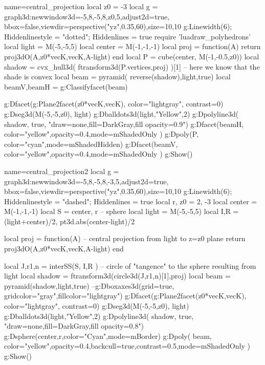 \documentclass[border=5pt]{standalone}%
\begin{document}
%
\begin{luadraw}{name=central_projection}
local z0 = -3
local g = graph3d:new{window3d={-5,8,-5,8,z0,5},adjust2d=true, bbox=false,viewdir=perspective("yz",0.35,60),size={10,10}}
g:Linewidth(6); Hiddenlinestyle = "dotted"; Hiddenlines = true
require 'luadraw_polyhedrons'
local light = M(-5,-5,5)
local center = M(-1,-1,-1)
local proj = function(A)
    return proj3dO(A,{z0*vecK,vecK},A-light)
end
local P = cube(center, M(-1,-0.5,z0))
local shadow = cvx_hull3d( ftransform3d(P.vertices,proj) )[1] -- here we know that the shade is convex
local beam = pyramid( reverse(shadow),light,true)
local beamV,beamH = g:Classifyfacet(beam)

g:Dfacet(g:Plane2facet({z0*vecK,vecK}), {color="lightgray", contrast=0})
g:Dseg3d({M(-5,-5,z0), light})
g:Dballdots3d(light,"Yellow",2)
g:Dpolyline3d( shadow, true, "draw=none,fill=DarkGray,fill opacity=0.9") 
g:Dfacet(beamH, {color="yellow",opacity=0.4,mode=mShadedOnly} )
g:Dpoly(P, {color="cyan",mode=mShadedHidden})
g:Dfacet(beamV, {color="yellow",opacity=0.4,mode=mShadedOnly} )
g:Show()
\end{luadraw}

\begin{luadraw}{name=central_projection2}
local g = graph3d:new{window3d={-5,8,-5,8,-3,5},adjust2d=true, bbox=false,viewdir=perspective("yz",0.35,60),size={10,10}}
g:Linewidth(6); Hiddenlinestyle = "dashed"; Hiddenlines = true
local r, z0 = 2, -3
local center = M(-1,-1,-1)
local S = {center, r} -- sphere
local light = M(-5,-5,5)
local I,R = (light+center)/2, pt3d.abs(center-light)/2

local proj = function(A) -- central projection from light to z=z0 plane
    return proj3dO(A,{z0*vecK,vecK},A-light)
end

local J,r1,n = interSS(S, {I,R} ) -- circle of "tangence" to the sphere resulting from light
local shadow = ftransform3d(circle3d(J,r1,n)[1],proj)
local beam = pyramid(shadow,light,true)
--g:Dboxaxes3d({grid=true, gridcolor="gray",fillcolor="lightgray"})
g:Dfacet(g:Plane2facet({z0*vecK,vecK}), {color="lightgray", contrast=0})
g:Dseg3d({M(-5,-5,z0), light})
g:Dballdots3d(light,"Yellow",2)
g:Dpolyline3d( shadow, true, "draw=none,fill=DarkGray,fill opacity=0.8") 
g:Dsphere(center,r,{color="Cyan",mode=mBorder})
g:Dpoly( beam, {color="yellow",opacity=0.4,backcull=true,contrast=0.5,mode=mShadedOnly} )
g:Show()
\end{luadraw}
\end{document}
